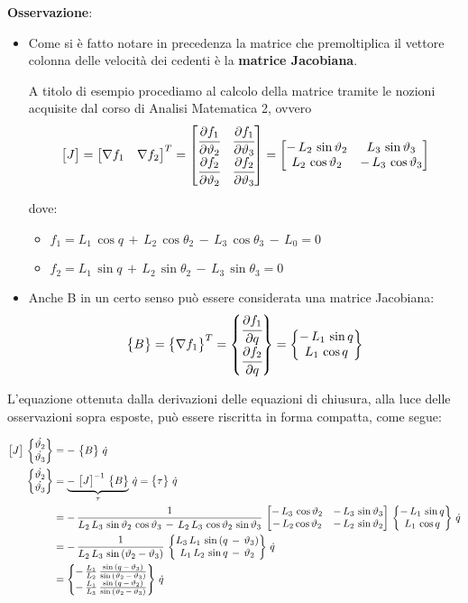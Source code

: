 	\textbf{Osservazione}:
	\begin{itemize}
	\item Come si è fatto notare in precedenza la matrice che premoltiplica il vettore colonna delle velocità dei cedenti è la \textbf{matrice Jacobiana}.
	
	A titolo di esempio procediamo al calcolo della matrice tramite le nozioni acquisite dal corso di Analisi Matematica 2, ovvero
	\begin{equation*}
	 \begin{bmatrix}J\end{bmatrix} = \begin{bmatrix}\nabla{f_1}&\nabla{f_2}\end{bmatrix}^T = \begin{bmatrix}\cfrac{\partial f_1}{\partial\vartheta_2} & \cfrac{\partial f_1}{\partial\vartheta_3}\\\cfrac{\partial f_2}{\partial\vartheta_2} & \cfrac{\partial f_2}{\partial\vartheta_3}\end{bmatrix} = \begin{bmatrix}-\,L_2\,\sin{\vartheta_2} & L_3\,\sin{\vartheta_3}\\L_2\,\cos{\vartheta_2}& -\,L_3\,\cos{\vartheta_3}\end{bmatrix}
	\end{equation*}
	
	dove:	\begin{itemize}
		\item $f_1 = L_1\,\cos{q}\,+\,L_2\,\cos{\theta_2}\,-\,L_3\,\cos{\theta_3}\,-\,L_0 = 0$
		\item $f_2 = L_1\,\sin{q}\,+\,L_2\,\sin{\theta_2}\,-\,L_3\,\sin{\theta_3 = 0}$
	\end{itemize}
	
	\item Anche B in un certo senso può essere considerata una matrice Jacobiana:
	\[
	\begin{Bmatrix}B\end{Bmatrix} = \begin{Bmatrix}\nabla f_1\end{Bmatrix}^T = \begin{Bmatrix}\cfrac{\partial f_1}{\partial q}\\\cfrac{\partial f_2}{\partial q}\end{Bmatrix} = \begin{Bmatrix}-\,L_1\,\sin{q}\\L_1\,\cos{q}\end{Bmatrix}
	\]
	\end{itemize}
	
	L'equazione ottenuta dalla derivazioni delle equazioni di chiusura, alla luce delle osservazioni sopra esposte, può essere riscritta in forma compatta, come segue:
	
		\begin{align*}
			\begin{bmatrix}J\end{bmatrix}\,\begin{Bmatrix}\dot{\vartheta_2}\\\dot{\vartheta_3}\end{Bmatrix} &= -\,\begin{Bmatrix}B\end{Bmatrix}\,\dot{q}\\
			\begin{Bmatrix}\dot{\vartheta_2}\\\dot{\vartheta_3}\end{Bmatrix} &= \underbrace{-\,\begin{bmatrix}J\end{bmatrix}^{-1}\,\begin{Bmatrix}B\end{Bmatrix}}_{\tau}\,\dot{q} = \begin{Bmatrix}\tau\end{Bmatrix}\,\dot{q}\\
			 &= -\,\frac{1}{L_2\,L_3\,\sin{\vartheta_2}\,\cos{\vartheta_3}\,-\,L_2\,L_3\,\cos{\vartheta_2}\,\sin{\vartheta_3}}\,\begin{bmatrix}-\,L_3\,\cos{\vartheta_2}&-\,L_3\,\sin{\vartheta_3}\\-\,L_2\cos{\vartheta_2}&-\,L_2\,\sin{\vartheta_2}\end{bmatrix}\,\begin{Bmatrix}-\,L_1\,\sin{q}\\L_1\,\cos{q}\end{Bmatrix}\,\dot{q}\\
			&= -\,\frac{1}{L_2\,L_3\,\sin{(\vartheta_2-\vartheta_3)}}\,\begin{Bmatrix}L_3\,L_1\,\sin{(q\,-\,\vartheta_3)}\\L_1\,L_2\,\sin{q\,-\,\vartheta_2}\end{Bmatrix}\,\dot{q}
			\\
			&= \begin{Bmatrix}-\,\frac{L_1}{L_2}\,\frac{\sin{(q\,-\,\vartheta_3)}}{\sin{(\vartheta_2\,-\,\vartheta_3)}}\\ -\,\frac{L_1}{L_3}\,\frac{\sin{(q\,-\,\vartheta_2)}}{\sin{(\vartheta_2\,-\,\vartheta_3)}}\end{Bmatrix}\,\dot{q}
		\end{align*}
	
